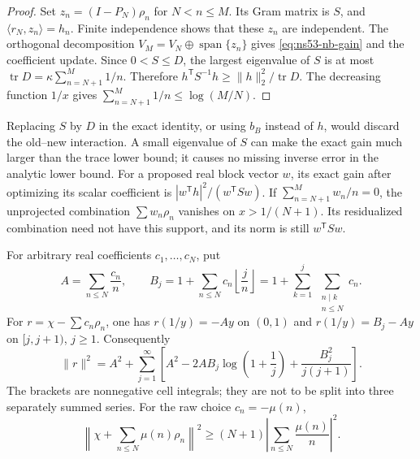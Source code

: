 \begin{proof}
Set $z_n=(I-P_N)\rho_n$ for $N<n\leq M$. Its Gram matrix is $S$,
and $\langle r_N,z_n\rangle=h_n$. Finite independence shows that these
$z_n$ are independent. The orthogonal decomposition
$V_M=V_N\mathbin{\oplus}\operatorname{span}\{z_n\}$ gives
\eqref{eq:ns53-nb-gain} and the coefficient update. Since
$0<S\leq D$, the largest eigenvalue of $S$ is at most
$\operatorname{tr}D=\kappa\sum_{n=N+1}^M1/n$. Therefore
$h^{\mathsf T}S^{-1}h\geq\|h\|_2^2/\operatorname{tr}D$.
The decreasing function $1/x$ gives
$\sum_{n=N+1}^M1/n\leq\log(M/N)$.
\end{proof}

\begin{remark}
Replacing $S$ by $D$ in the exact identity, or using $b_B$ instead of $h$,
would discard the old--new interaction. A small eigenvalue of $S$ can
make the exact gain much larger than the trace lower bound; it causes no
missing inverse error in the analytic lower bound. For a proposed real
block vector $w$, its exact gain after optimizing its scalar coefficient
is $|w^{\mathsf T}h|^2/(w^{\mathsf T}Sw)$. If
$\sum_{n=N+1}^M w_n/n=0$, the unprojected combination
$\sum w_n\rho_n$ vanishes on $x>1/(N+1)$. Its residualized combination
need not have this support, and its norm is still $w^{\mathsf T}Sw$.
\end{remark}

\begin{proposition}
\label{prop:ns53-nb-divisor-cells}
For arbitrary real coefficients $c_1,\ldots,c_N$, put
\[
 A=\sum_{n\leq N}\frac{c_n}{n},\qquad
 B_j=1+\sum_{n\leq N}c_n\left\lfloor\frac jn\right\rfloor
     =1+\sum_{k=1}^j\ \sum_{\substack{n\mid k\\n\leq N}}c_n.
\]
For $r=\chi-\sum c_n\rho_n$, one has $r(1/y)=-Ay$ on $(0,1)$
and $r(1/y)=B_j-Ay$ on $[j,j+1)$, $j\geq1$. Consequently
\begin{equation}
 \|r\|^2=A^2+\sum_{j=1}^{\infty}
 \left[A^2-2AB_j\log\left(1+\frac1j\right)
          +\frac{B_j^2}{j(j+1)}\right].
 \label{eq:ns53-nb-divisor-energy}
\end{equation}
The brackets are nonnegative cell integrals; they are not to be split
into three separately summed series. For the raw choice $c_n=-\mu(n)$,
\begin{equation}
 \left\|\chi+\sum_{n\leq N}\mu(n)\rho_n\right\|^2
 \geq (N+1)\left|\sum_{n\leq N}\frac{\mu(n)}n\right|^2.
 \label{eq:ns53-nb-mobius-penalty}
\end{equation}
\end{proposition}

